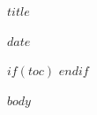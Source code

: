 \documentclass[12pt,a4paper]{article}
\begin{document}
\begin{titlepage}
  \centering
  \vspace*{5cm}
  {\Huge\bfseries $title$\par}
  \vspace{1.5cm}
  {\large $date$\par}
  \vfill
\end{titlepage}

$if(toc)$
{
  \hypersetup{linkcolor=black}
  \tableofcontents
  \newpage
}
$endif$

$body$
\end{document}
